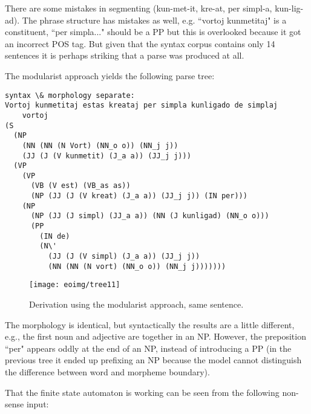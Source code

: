 \documentclass[10pt,a4paper]{article}
\begin{document}
There are some mistakes in segmenting (kun-met-it, kre-at, per simpl-a,
kun-lig-ad).  The phrase structure has mistakes as well, e.g. ``vortoj
kunmetitaj" is a constituent, ``per simpla..." should be a PP but this is
overlooked because it got an incorrect POS tag. But given that the syntax
corpus contains only 14 sentences it is perhaps striking that a parse was
produced at all.

The modularist approach yields the following parse tree:

\begin{verbatim}
syntax \& morphology separate:
Vortoj kunmetitaj estas kreataj per simpla kunligado de simplaj 
	vortoj 
(S
  (NP
    (NN (NN (N Vort) (NN_o o)) (NN_j j))
    (JJ (J (V kunmetit) (J_a a)) (JJ_j j)))
  (VP
    (VP
      (VB (V est) (VB_as as))
      (NP (JJ (J (V kreat) (J_a a)) (JJ_j j)) (IN per)))
    (NP
      (NP (JJ (J simpl) (JJ_a a)) (NN (J kunligad) (NN_o o)))
      (PP
        (IN de)
        (N\'
          (JJ (J (V simpl) (J_a a)) (JJ_j j))
          (NN (NN (N vort) (NN_o o)) (NN_j j)))))))
\end{verbatim}

\begin{figure}
\centering
\texttt{[image: eoimg/tree11]}
\caption{Derivation using the modularist approach, same sentence.}
\label{s4}
\end{figure}

The morphology is identical, but syntactically the results are a little
different, e.g., the first noun and adjective are together in an NP. However,
the preposition ``per" appears oddly at the end of an NP, instead of
introducing a PP (in the previous tree it ended up prefixing an NP because the
model cannot distinguish the difference between word and morpheme boundary).

That the finite state automaton is working can be seen from
the following non-sense input:
\end{document}

